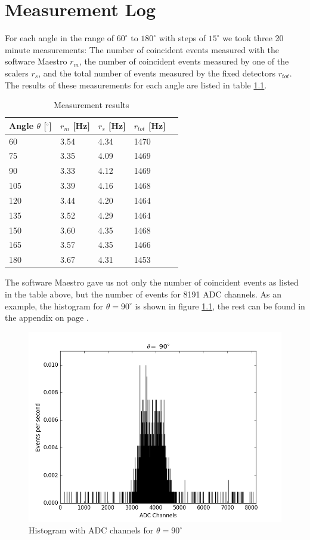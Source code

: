 \documentclass[a4paper,parskip,11pt, DIV12]{scrreprt}
\begin{document}
\chapter{Measurement Log}
For each angle in the range of $60^{\circ}$ to $180^{\circ}$ with steps of $15^{\circ}$ we took three 20 minute measurements: The number of coincident events measured with the software Maestro $r_m$, the number of coincident events measured by one of the scalers $r_s$, and the total number of events measured by the fixed detectors $r_{tot}$. The results of these measurements for each angle are listed in table \ref{tab:measurement}. 
%
\begin{table}[H]\label{tab:measurement}
\begin{center}
\begin{tabular}{lllll}
Angle $\theta$ [$^{\circ}$] & $r_{m}$ [Hz] & $r_{s}$ [Hz] & $r_{tot}$ [Hz]\\
\hline
60 	& 3.54 & 4.34 & 1470\\
75 	& 3.35 & 4.09 & 1469\\
90 	& 3.33 & 4.12 & 1469\\
105 	& 3.39 & 4.16 & 1468\\
120	& 3.44 & 4.20 & 1464\\
135	& 3.52 & 4.29 & 1464\\
150	& 3.60 & 4.35 & 1468\\
165	& 3.57 & 4.35 & 1466\\
180	& 3.67 & 4.31 & 1453\\ 
\end{tabular}
\caption{Measurement results}
\label{tab:measurement}
\end{center}
\end{table}
%
The software Maestro gave us not only the number of coincident events as listed in the table above, but the number of events for 8191 ADC channels. As an example, the histogram for $\theta = 90^{\circ}$ is shown in figure \ref{fig:histogramraw}, the rest can be found in the appendix on page \pageref{app:histogramraw}.
%
\begin{figure}[H]
\centering
\includegraphics[scale=0.65]{90degraw.png}
\caption[Histogram]{Histogram with ADC channels for $\theta = 90^{\circ}$}
\label{fig:histogramraw}
\end{figure}
%
\end{document}
